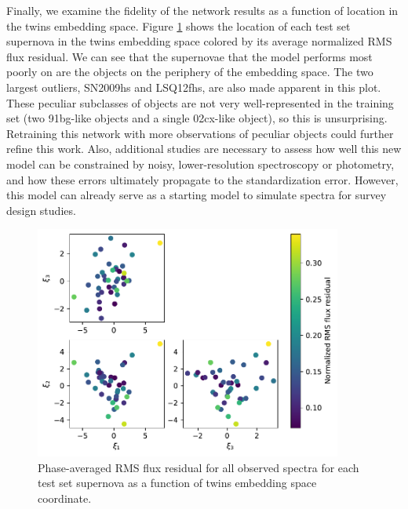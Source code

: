 Finally, we examine the fidelity of the \etos{} network results as a function of location in the twins embedding space. Figure \ref{fig:e2s_embedding_resids} shows the location of each test set supernova in the twins embedding space colored by its average normalized RMS flux residual. We can see that the supernovae that the model performs most poorly on are the objects on the periphery of the embedding space. The two largest outliers, SN2009hs and LSQ12fhs, are also made apparent in this plot. These peculiar subclasses of objects are not very well-represented in the training set (two 91bg-like objects and a single 02cx-like object), so this is unsurprising. Retraining this network with more observations of peculiar objects could further refine this work. Also, additional studies are necessary to assess how well this new model can be constrained by noisy, lower-resolution spectroscopy or photometry, and how these errors ultimately propagate to the standardization error. However, this model can already serve as a starting model to simulate spectra for survey design studies.

\begin{figure}
    \centering
    \includegraphics[width=0.9\textwidth]{figures/nn_twins/embed2spec_rms_embedding.pdf}
    \caption{Phase-averaged RMS flux residual for all observed spectra for each test set supernova as a function of twins embedding space coordinate.}
    \label{fig:e2s_embedding_resids}
\end{figure}

